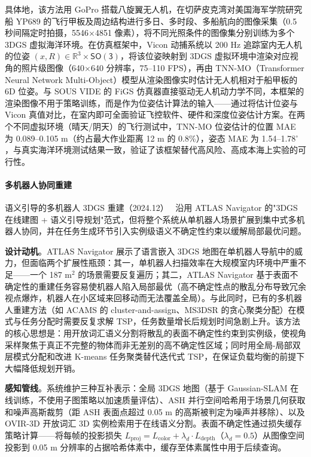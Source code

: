具体地，该方法用 GoPro 搭载八旋翼无人机，在切萨皮克湾对美国海军学院研究船 YP689 的飞行甲板及周边结构进行多日、多时段、多船航向的图像采集（0.5 秒间隔定时拍摄，5546$\times$4851 像素），将不同光照条件的图像集分别训练为多个 3DGS 虚拟海洋环境。在仿真框架中，Vicon 动捕系统以 200 Hz 追踪室内无人机的位姿 $(x, R) \in \mathbb{R}^3 \times \mathsf{SO(3)}$，将该位姿映射到 3DGS 虚拟环境中渲染对应视角的照片级图像（640$\times$640 分辨率，75--110 FPS），再由 TNN-MO（Transformer Neural Network Multi-Object）模型从渲染图像实时估计无人机相对于船甲板的 6D 位姿。与 SOUS VIDE 的 FiGS 仿真器直接驱动无人机动力学不同，本框架的渲染图像不用于策略训练，而是作为位姿估计算法的输入——通过将估计位姿与 Vicon 真值对比，在室内即可全面验证飞控软件、硬件和深度位姿估计方案。在两个不同虚拟环境（晴天/阴天）的飞行测试中，TNN-MO 位姿估计的位置 MAE 为 0.089--0.105 m（约占最大作业距离 12 m 的 0.8\%），姿态 MAE 为 1.54--1.78$^\circ$，与真实海洋环境测试结果一致，验证了该框架替代高风险、高成本海上实验的可行性。

\paragraph{多机器人协同重建}

语义引导的多机器人 3DGS 重建（2024.12）~\cite{2412_02249} 沿用 ATLAS Navigator 的"3DGS 在线建图 + 语义引导规划"范式，但将整个系统从单机器人场景扩展到集中式多机器人协同，并在任务生成环节引入实例级语义不确定性约束以缓解局部最优问题。

\textbf{设计动机}。ATLAS Navigator 展示了语言嵌入 3DGS 地图在单机器人导航中的威力，但面临两个扩展性瓶颈：其一，单机器人扫描效率在大规模室内环境中严重不足——一个 187 m$^2$ 的场景需要反复遍历；其二，ATLAS Navigator 基于表面不确定性的重建任务容易使机器人陷入局部最优（高不确定性点的散乱分布导致冗余视点爆炸，机器人在小区域来回移动而无法覆盖全局）。与此同时，已有的多机器人重建方法（如 ACAMS 的 cluster-and-assign、MS3DSR 的贪心聚类分配）在模式与任务分配时需要反复求解 TSP，任务数量增长后规划时间急剧上升。该方法的核心思想是：用开放词汇语义分割将散乱的表面不确定性约束到实例级，使视角采样聚焦于真正不完整的物体而非无差别的高不确定性区域；同时用全局-局部双层模式分配和改进 K-means 任务聚类替代迭代式 TSP，在保证负载均衡的前提下大幅降低规划开销。

\textbf{感知管线}。系统维护三种互补表示：全局 3DGS 地图（基于 Gaussian-SLAM 在线训练，不使用子图策略以加速质量评估）、ASH 并行空间哈希用于场景几何获取和噪声高斯裁剪（距 ASH 表面点超过 0.05 m 的高斯被判定为噪声并移除）、以及 OVIR-3D 开放词汇 3D 实例检索用于在线语义分割。表面不确定性通过损失缓存策略计算——将每帧的投影损失 $L_\text{proj} = L_\text{color} + \lambda_d \cdot L_\text{depth}$（$\lambda_d=0.5$）从图像空间投影到 0.05 m 分辨率的占据哈希体素中，缓存至体素属性中用于后续查询。

